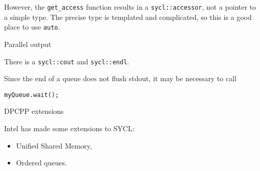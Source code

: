 However, the \lstinline+get_access+ function results
in a \lstinline+sycl::accessor+, not a pointer to a simple type.
The precise type is templated and complicated, so this 
is a good place to use \lstinline+auto+.

 {Parallel output}

There is a \lstinline+sycl::cout+ and \lstinline+sycl::endl+.


Since the end of a queue does not flush stdout,
it may be necessary to call
\begin{lstlisting}
myQueue.wait();  
\end{lstlisting}

 {DPCPP extensions}

Intel has made some extensions to SYCL:
\begin{itemize}
\item Unified Shared Memory,
\item Ordered queues.
\end{itemize}
